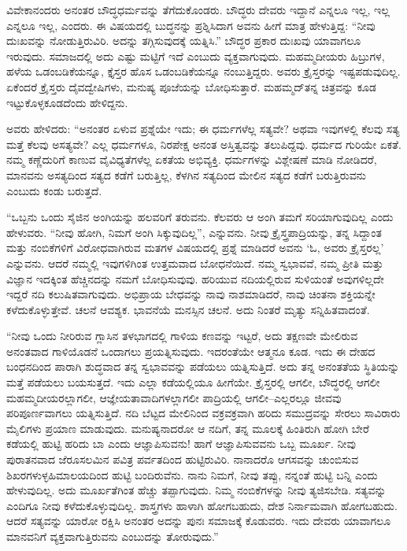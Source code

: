 ವಿವೇಕಾನಂದರು ಅನಂತರ ಬೌದ್ಧಧರ್ಮವನ್ನು ತೆಗೆದುಕೊಂಡರು. ಬೌದ್ಧರು ದೇವರು ಇದ್ದಾನೆ ಎನ್ನಲೂ ಇಲ್ಲ, ಇಲ್ಲ ಎನ್ನಲೂ ಇಲ್ಲ, ಎಂದರು. ಈ ವಿಷಯದಲ್ಲಿ ಬುದ್ಧನನ್ನು ಪ್ರಶ್ನಿಸಿದಾಗ ಅವನು ಹೀಗೆ ಮಾತ್ರ ಹೇಳುತ್ತಿದ್ದ: “ನೀವು ದುಃಖವನ್ನು ನೋಡುತ್ತಿರುವಿರಿ. ಅದನ್ನು ತಗ್ಗಿಸುವುದಕ್ಕೆ ಯತ್ನಿಸಿ.” ಬೌದ್ಧರ ಪ್ರಕಾರ ದುಃಖವು ಯಾವಾಗಲೂ ಇರುವುದು. ಸಮಾಜದಲ್ಲಿ ಅದು ಎಷ್ಟು ಮಟ್ಟಿಗೆ ಇದೆ ಎಂಬುದು ವ್ಯಕ್ತವಾಗುವುದು. ಮಹಮ್ಮದೀಯರು ಹಿಬ್ರುಗಳ, ಹಳೆಯ ಒಡಂಬಡಿಕೆಯನ್ನೂ, ಕ್ತೈಸ್ತರ ಹೊಸ ಒಡಂಬಡಿಕೆಯನ್ನೂ ನಂಬುತ್ತಿದ್ದರು. ಅವರು ಕ್ರೈಸ್ತರನ್ನು ಇಷ್ಟಪಡುವುದಿಲ್ಲ. ಏಕೆಂದರೆ ಕ್ರೈಸ್ತರು ದೈವದ್ವೇಷಿಗಳು, ಮನುಷ್ಯ ಪೂಜೆಯನ್ನು ಬೋಧಿಸುತ್ತಾರೆ. ಮಹಮ್ಮದ್​ ತನ್ನ ಚಿತ್ರವನ್ನು ಕೂಡ ಇಟ್ಟುಕೊಳ್ಳ\break ಕೂಡದೆಂದು ಹೇಳಿದ್ದನು.

ಅವರು ಹೇಳಿದರು: “ಅನಂತರ ಏಳುವ ಪ್ರಶ್ನೆಯೇ ಇದು; ಈ ಧರ್ಮಗಳೆಲ್ಲ ಸತ್ಯವೇ? ಅಥವಾ ಇವುಗಳಲ್ಲಿ ಕೆಲವು ಸತ್ಯ ಮತ್ತೆ ಕೆಲವು ಅಸತ್ಯವೇ? ಎಲ್ಲ ಧರ್ಮಗಳೂ, ನಿರಪೇಕ್ಷ ಅನಂತ ಅಸ್ತಿತ್ವವನ್ನು ತಲುಪಿದ್ದವು. ಧರ್ಮದ ಗುರಿಯೇ ಏಕತೆ. ನಮ್ಮ ಕಣ್ಣೆದುರಿಗೆ ಕಾಣುವ ವೈವಿಧ್ಯತೆಗಳೆಲ್ಲ ಏಕತೆಯ ಅಭಿವ್ಯಕ್ತಿ. ಧರ್ಮಗಳನ್ನು ವಿಶ್ಲೇಷಣೆ ಮಾಡಿ ನೋಡಿದರೆ, ಮಾನವನು ಅಸತ್ಯದಿಂದ ಸತ್ಯದ ಕಡೆಗೆ ಬರುತ್ತಿಲ್ಲ, ಕೆಳಗಿನ ಸತ್ಯದಿಂದ ಮೇಲಿನ ಸತ್ಯದ ಕಡೆಗೆ ಬರುತ್ತಿರುವನು ಎಂಬುದು ಕಂಡು ಬರುತ್ತದೆ.

“ಒಬ್ಬನು ಒಂದು ಸೈಜಿನ ಅಂಗಿಯನ್ನು ಹಲವರಿಗೆ ತರುವನು. ಕೆಲವರು ಆ ಅಂಗಿ ತಮಗೆ ಸರಿಯಾಗುವುದಿಲ್ಲ ಎಂದು ಹೇಳುವರು. “ನೀವು ಹೋಗಿ, ನಿಮಗೆ ಅಂಗಿ ಸಿಕ್ಕುವುದಿಲ್ಲ”, ಎನ್ನುವನು. ನೀವು ಕ್ರೈಸ್ತ್ರಪಾದ್ರಿಯನ್ನು, ತನ್ನ ಸಿದ್ದಾಂತ ಮತ್ತು ನಂಬಿಕೆಗಳಿಗೆ ವಿರೋಧವಾಗಿರುವ ಮತಗಳ ವಿಷಯದಲ್ಲಿ ಪ್ರಶ್ನೆ ಮಾಡಿದರೆ ಅವನು ‘ಓ, ಅವರು ಕ್ರೈಸ್ತರಲ್ಲ’ ಎನ್ನುವನು. ಆದರೆ ನಮ್ಮಲ್ಲಿ ಇವುಗಳಿಗಿಂತ ಉತ್ತಮವಾದ ಬೋಧನೆಯಿದೆ. ನಮ್ಮ ಸ್ವಭಾವವೆ, ನಮ್ಮ ಪ್ರೀತಿ ಮತ್ತು ವಿಜ್ಞಾನ ಇದಕ್ಕಿಂತ ಹೆಚ್ಚಿನದನ್ನು ನಮಗೆ ಬೋಧಿಸುವುವು. ಹರಿಯುವ ನದಿಯಲ್ಲಿರುವ ಸುಳಿಯಂತೆ ಅವುಗಳಿಲ್ಲದೇ ಇದ್ದರೆ ನದಿ ಕಲುಷಿತವಾಗುವುದು. ಅಭಿಪ್ರಾಯ ಬೇಧವನ್ನು ನಾವು ನಾಶಮಾಡಿದರೆ, ನಾವು ಚಿಂತನಾ ಶಕ್ತಿಯನ್ನೇ ಕಳೆದುಕೊಳ್ಳುತ್ತೇವೆ. ಚಲನೆ ಆವಶ್ಯಕ. ಭಾವನೆಯೆ ಮನಸ್ಸಿನ ಚಲನೆ. ಅದು ನಿಂತರೆ ಮೃತ್ಯು ಸನ್ನಿಹಿತವಾದಂತೆ.

“ನೀವು ಒಂದು ನೀರಿರುವ ಗ್ಲಾಸಿನ ತಳಭಾಗದಲ್ಲಿ ಗಾಳಿಯ ಕಣವನ್ನು ಇಟ್ಟರೆ, ಅದು ತಕ್ಷಣವೇ ಮೇಲಿರುವ ಅನಂತವಾದ ಗಾಳಿಯೊಡನೆ ಒಂದಾಗಲು ಪ್ರಯತ್ನಿಸುವುದು. ಇದರಂತೆಯೇ ಆತ್ಮನೂ ಕೂಡ. ಇದು ಈ ದೇಹದ ಬಂಧನದಿಂದ ಪಾರಾಗಿ ಶುದ್ಧವಾದ ತನ್ನ ಸ್ವಭಾವವನ್ನು ಪಡೆಯಲು ಯತ್ನಿಸುತ್ತಿದೆ. ಅದು ತನ್ನ ಅನಂತತೆಯ ಸ್ಥಿತಿಯನ್ನು ಮತ್ತೆ ಪಡೆಯಲು ಬಯಸುತ್ತದೆ. ಇದು ಎಲ್ಲಾ ಕಡೆಯಲ್ಲಿಯೂ ಹೀಗೆಯೇ. ಕ್ರೈಸ್ತರಲ್ಲಿ ಆಗಲೀ, ಬೌದ್ಧರಲ್ಲಿ ಆಗಲೀ ಮಹಮ್ಮದೀಯರಲ್ಲಾಗಲೀ, ಆಜ್ಞೇಯತಾವಾದಿಗಳಲ್ಲಾಗಲೀ ಪಾದ್ರಿಯಲ್ಲಿ ಆಗಲೀ–ಎಲ್ಲರಲ್ಲೂ ಜೀವವು ಪರಿಪೂರ್ಣವಾಗಲು ಯತ್ನಿಸುತ್ತಿದೆ. ನದಿ ಬೆಟ್ಟದ ಮೇಲಿನಿಂದ ವಕ್ರವಕ್ರವಾಗಿ ಹರಿದು ಸಮುದ್ರವನ್ನು ಸೇರಲು ಸಾವಿರಾರು ಮೈಲಿಗಳು ಪ್ರಯಾಣ ಮಾಡುವುದು. ಮನುಷ್ಯನಾದರೋ ಆ ನದಿಗೆ, ತನ್ನ ಮೂಲಕ್ಕೆ ಹಿಂತಿರುಗಿ ಹೋಗಿ ಬೇರೆ ಕಡೆಯಲ್ಲಿ ಹುಟ್ಟಿ ಹರಿದು ಬಾ ಎಂದು ಆಜ್ಞಾಪಿಸುವನು! ಹಾಗೆ ಆಜ್ಞಾಪಿಸುವವನು ಒಬ್ಬ ಮೂರ್ಖ. ನೀವು ಪುರಾತನವಾದ ಜೆರೂಸಲಮಿನ ಪವಿತ್ರ ಪರ್ವತದಿಂದ ಹುಟ್ಟಿರುವಿರಿ. ನಾನಾದರೊ ಆಗಸವನ್ನು ಚುಂಬಿಸುವ ಶಿಖರಗಳುಳ್ಳ\break ಹಿಮಾಲಯದಿಂದ ಹುಟ್ಟಿ ಬಂದಿರುವೆನು. ನಾನು ನಿಮಗೆ, ನೀವು ತಪ್ಪು, ನನ್ನಂತೆ ಹುಟ್ಟಿ ಬನ್ನಿ ಎಂದು ಹೇಳುವುದಿಲ್ಲ. ಅದು ಮೂರ್ಖತೆಗಿಂತ ಹೆಚ್ಚು ತಪ್ಪಾಗುವುದು. ನಿಮ್ಮ ನಂಬಿಕೆಗಳನ್ನು ನೀವು ತ್ಯಜಿಸಬೇಡಿ. ಸತ್ಯವನ್ನು ಎಂದಿಗೂ ನೀವು ಕಳೆದುಕೊಳ್ಳುವುದಿಲ್ಲ. ಶಾಸ್ತ್ರಗಳು ಹಾಳಾಗಿ ಹೋಗಬಹುದು, ದೇಶ ನಿರ್ನಾಮವಾಗಿ ಹೋಗಬಹುದು. ಆದರೆ ಸತ್ಯವನ್ನು ಯಾರೋ ರಕ್ಷಿಸಿ ಅನಂತರ ಅದನ್ನು ಪುನಃ ಸಮಾಜಕ್ಕೆ ಕೊಡುವರು. ಇದು ದೇವರು ಯಾವಾಗಲೂ ಮಾನವನಿಗೆ ವ್ಯಕ್ತವಾಗುತ್ತಿರುವನು ಎಂಬುದನ್ನು ತೋರುವುದು.”


